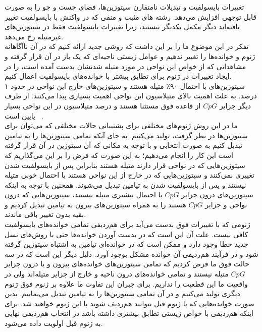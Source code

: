 تغییرات بایسولفیت و تبدیلات نامتقارن سیتوزین‌ها، فضای جست و جو را به صورت قابل توجهی افزایش می‌دهد. رشته های مثبت و منفی که در واکنش با بایسولفیت تغییر یافته‌اند دیگر مکمل یکدیگر نیستند، زیرا تغییرات بایسولفیت فقط در سیتوزین‌های غیرمتیله رخ می‌دهد.
\\
تفکر در این موضوع ما را بر این داشت که روشی جدید ارائه کنیم که در آن ناآگاهانه ژنوم و خوانده‌ها را تغییر ندهیم و عوامل زیستی ناحیه‌ای که یک باز در آن قرار گرفته و مشاهداتی که از خواص این نواحی در مورد متیله شدنشان بدست آمده است، را در ایجاد تغییرات در ژنوم برای تطابق بیشتر با خوانده‌های بایسولفیت اعمال کنیم.
\\
سیتوزین‌های  با احتمال ۹۰٪ متیله هستند و سیتوزین‌های خارج این نواحی در حدود ۱ درصد. به علت اهمیت بالای متیلاسیون این نواحی اهمیت بسیاری پیدا می‌کنند. از طرف دیگر جزایر $CpG$ از قاعده فوق مستثنا هستند و درصد متیلاسیون در این نواحی بسیار پایین است
~\cite{meissner2008genome}.
\\
ما در این روش ژنوم‌های مختلفی برای پشتیبانی حالات مختلفی که می‌توان برای سیتوزین‌ها در نظر گرفت، تولید می‌کنیم. به جای آنکه تمامی سیتوزین‌ها را به تیامین تبدیل کنیم به صورت انتخابی و با توجه به مکانی که آن سیتوزین در آن قرار گرفته است این کار را انجام می‌دهیم؛ به این صورت که فرض را بر این می‌گذاریم که سیتوزین‌هایی که در نواحی  قرار دارند متیله هستند بنابراین پس از بایسولفیت شدن تغییری نمی‌کنند و سیتوزین‌هایی که در خارج از این نواحی هستند با احتمال خوبی متیله نیستند و پس از بایسولفیت شدن به تیامین تبدیل می‌شوند. همچنین با توجه به اینکه سیتوزین‌های درون جزایر $CpG$ با احتمال بیشتری متیله نیستند، سیتوزین‌هایی که درون نواحی  و جزایر $CpG$ هستند را به همراه سیتوزین‌های بیرون   به تیامین تبدیل کردیم و بقیه بدون تغییر باقی ماندند.
\\
ژنومی که با تغییرات فوق بدست می‌آید برای هم‌ردیفی تمامی خوانده‌های بایسولفیت کافی نیست. علت آن این است که در بدست آوردن خوانده‌ها حتی با روش‌های نسل جدید خطا وجود دارد و ممکن است که در خوانده‌ای تیامین به اشتباه سیتوزین گرفته شود و در فرآیند هم‌ردیفی آن خوانده مشکل بوجود آورد. دلیل دیگر این است که در سه حالت فوق ما فرض کردیم که تمامی سیتوزین‌های خوانده‌های بیرون  و یا درون جزایر $CpG$ متیله نیستند و تمامی خوانده‌های درون ناحیه و خارج از جزایر متیله‌اند ولی در واقعیت ما این قطعیت را نداریم. برای جبران این تفاوت ما علاوه بر ژنوم فوق ژنوم دیگری تولید می‌کنیم و در آن تمامی سیتوزین‌ها را به تیامین تبدیل می‌نماییم. بدین صورت خوانده‌هایی که با ژنوم قبل نتوانند هم‌ردیف شوند با این ژنوم خواهند شد. برای اینکه هم‌ردیفی با خواص زیستی تطابق بیشتری داشته باشد در انتخاب هم‌ردیفی نهایی به ژنوم قبل اولویت داده می‌شود.
